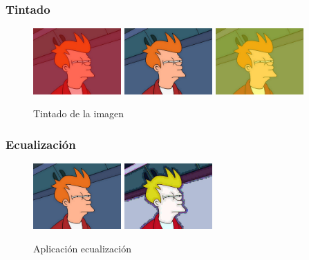 \subsubsection{Tintado}
\vskip0.3cm
\begin{figure}[H]
 \centering
  \includegraphics[width=0.3\textwidth]{imagenes/fryTinteRojo.jpg}
  \includegraphics[width=0.3\textwidth]{imagenes/Fry.jpg}
  \includegraphics[width=0.3\textwidth]{imagenes/fryTinteAmarillo.jpg}
 \caption{Tintado de la imagen}
 \label{diseño}
\end{figure}
\subsubsection{Ecualización}
\vskip0.3cm
\begin{figure}[H]
 \centering
  \includegraphics[width=0.3\textwidth]{imagenes/Fry.jpg}
  \includegraphics[width=0.3\textwidth]{imagenes/fryEcualizacion.jpg}
 \caption{Aplicación ecualización}
 \label{diseño}
\end{figure}

